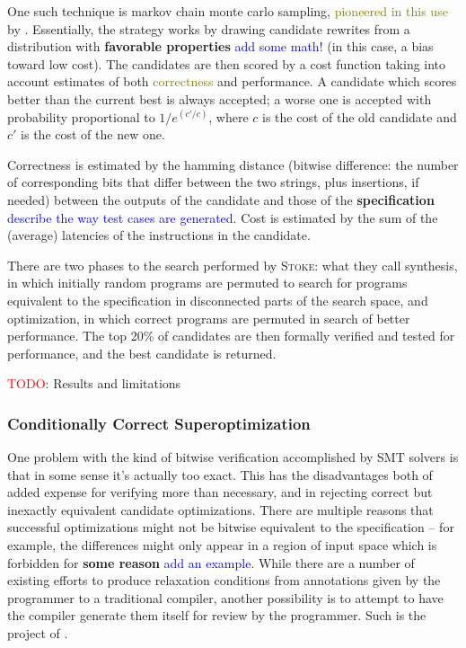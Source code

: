 \documentclass[12pt,twoside]{reedthesis}
\newcommand{\red}[1]{\textcolor{red}{#1}}
\newcommand{\green}[1]{\textcolor{olive}{#1}}
\newcommand{\comment}[2]{\textbf{#1} \textcolor{blue}{#2}}
\newcommand{\addressed}[2]{{#1}}
\begin{document}
One such technique is markov chain monte carlo sampling, \green{pioneered in this use} by \cite{schkufza2013stoke}.
Essentially, the strategy works by drawing candidate rewrites from a distribution with \comment{favorable properties}{add some math!} (in this case, a bias toward low cost).
The candidates are then scored by a cost function taking into account estimates of both \green{correctness} and performance.
A candidate which scores better than the current best is always accepted; a worse one is accepted with probability proportional to $1/e^(c'/c)$, where $c$ is the cost of the old candidate and $c'$ is the cost of the new one.
    
Correctness is estimated by the hamming distance (bitwise difference: the number of corresponding bits that differ between the two strings, plus insertions, if needed) between the outputs of the candidate and those of the
    \comment{specification}{describe the way test cases are generated}.
Cost is estimated by the sum of the (average) latencies of the instructions in the candidate.
    
There are two phases to the search performed by \textsc{Stoke}:
    what they call synthesis, in which initially random programs are permuted to search for programs equivalent to the specification in disconnected parts of the search space,
    and optimization, in which correct programs are permuted in search of better performance.
The top 20\% of candidates are then formally verified and tested for performance, and the best candidate is returned.
    
\red{TODO}: Results and limitations

\subsubsection{Conditionally Correct Superoptimization}
One problem with the kind of bitwise verification accomplished by SMT solvers is that in some sense it's actually too exact.
This has the disadvantages both of added expense for verifying more than necessary, and in rejecting correct but inexactly equivalent candidate optimizations.
There are multiple reasons that successful optimizations might not be bitwise equivalent to the specification
    -- for example, the differences might only appear in a region of input space which is forbidden for \comment{some reason}{add an example}.
While there are a number of existing efforts to produce relaxation conditions from annotations given by the programmer to a traditional compiler, another possibility is to attempt to have the compiler generate them itself for review by the programmer.
Such is the project of \cite{sharma2015conditionally}.
    
\end{document}
